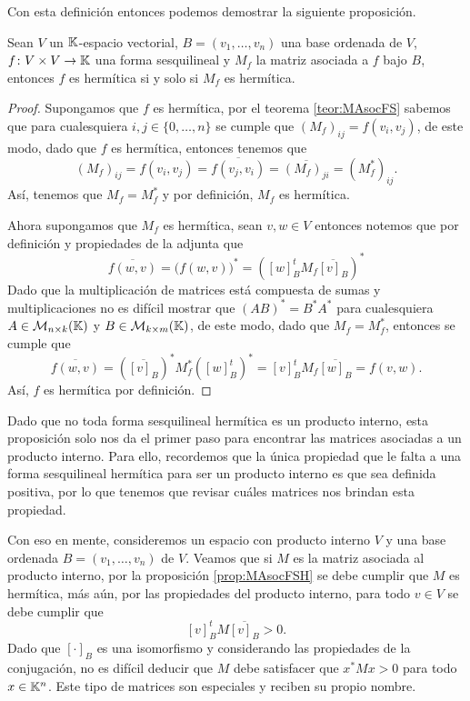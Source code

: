 Con esta definición entonces podemos demostrar la siguiente proposición.

\begin{prop}\label{prop:MAsocFSH}
  Sean $V$ un $\mathbb{K}$-espacio vectorial, $B = (v_1,\ldots,v_n)$ una base ordenada de $V$, $f\colon V\times V \to\mathbb{K}$ una forma sesquilineal y $M_f$ la matriz asociada a $f$ bajo $B$, entonces $f$ es hermítica si y solo si $M_f$ es hermítica.
\end{prop}
\begin{proof}
  Supongamos que $f$ es hermítica, por el teorema \ref{teor:MAsocFS} sabemos que para cualesquiera $i,j \in \{0,\ldots,n\}$ se cumple que $(M_f)_{ij} = f(v_i, v_j)$, de este modo, dado que $f$ es hermítica, entonces tenemos que
  \[
    (M_f)_{ij} = f(v_i, v_j) = \overline{f(v_j, v_i)} = \overline{(M_f)_{ji}} = (M_f^*)_{ij}.
  \]
  Así, tenemos que $M_f = M_f^*$ y por definición, $M_f$ es hermítica.

  Ahora supongamos que $M_f$ es hermítica, sean $v,w \in V$ entonces notemos que por definición y propiedades de la adjunta que
    \[
      \overline{f(w,v)} = \bigl(f(w,v)\bigr)^* = ([w]_B^t M_f \overline{[v]_B})^*
    \]
  Dado que la multiplicación de matrices está compuesta de sumas y multiplicaciones no es difícil mostrar que $(AB)^* = B^* A^*$ para cualesquiera $A \in \mathcal{M}_{n\times k} (\mathbb{K})$ y $B \in \mathcal{M}_{k\times m} (\mathbb{K})$, de este modo, dado que $M_f = M_f^*$, entonces se cumple que
    \[
      \overline{f(w,v)} =  (\overline{[v]_B})^* M_f^* ([w]_B^t)^* = [v]_B^tM_f \overline{[w]_B} = f(v,w).
    \]
  Así, $f$ es hermítica por definición.
\end{proof}

Dado que no toda forma sesquilineal hermítica es un producto interno, esta proposición solo nos da el primer paso para encontrar las matrices asociadas a un producto interno. Para ello, recordemos que la única propiedad que le falta a una forma sesquilineal hermítica para ser un producto interno es que sea definida positiva, por lo que tenemos que revisar cuáles matrices nos brindan esta propiedad.

Con eso en mente, consideremos un espacio con producto interno $V$ y una base ordenada $B = (v_1,\ldots,v_n)$ de $V$. Veamos que si $M$ es la matriz asociada al producto interno, por la proposición \ref{prop:MAsocFSH} se debe cumplir que $M$ es hermítica, más aún, por las propiedades del producto interno, para todo $v \in V$ se debe cumplir que 
  \[
    [v]_B^t M \overline{[v]_B} > 0.
  \]
Dado que $[\cdot]_B$ es una isomorfismo y considerando las propiedades de la conjugación, no es difícil deducir que $M$ debe satisfacer que $x^* M x > 0$ para todo $x \in \mathbb{K}^n$. Este tipo de matrices son especiales y reciben su propio nombre.

